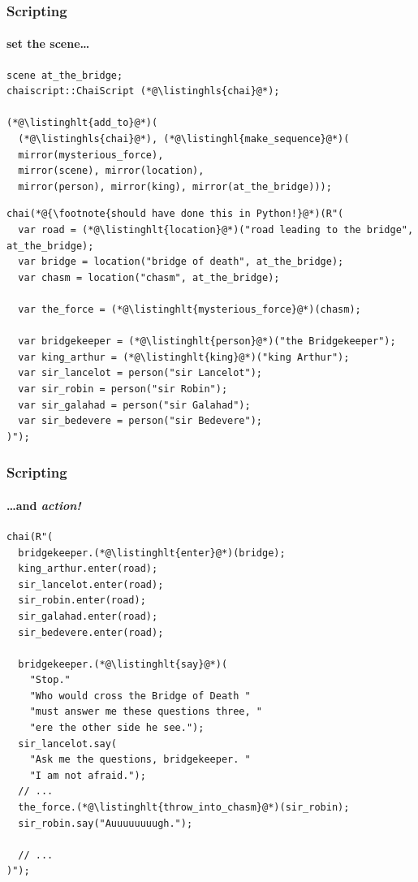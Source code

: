 \documentclass[compress,table,xcolor=table]{beamer}
\begin{document}
\begin{frame}[fragile]
  \frametitle{Scripting}
  \framesubtitle{set the scene\ldots}
  \begin{lstlisting}[language=c++2x,basicstyle=\scriptsize\ttfamily]
scene at_the_bridge;
chaiscript::ChaiScript (*@\listinghls{chai}@*);

(*@\listinghlt{add_to}@*)(
  (*@\listinghls{chai}@*), (*@\listinghl{make_sequence}@*)(
  mirror(mysterious_force),
  mirror(scene), mirror(location),
  mirror(person), mirror(king), mirror(at_the_bridge)));
  \end{lstlisting}
  \begin{lstlisting}[language=c++2x,basicstyle=\tiny\ttfamily]
chai(*@{\footnote{should have done this in Python!}@*)(R"(
  var road = (*@\listinghlt{location}@*)("road leading to the bridge", at_the_bridge);
  var bridge = location("bridge of death", at_the_bridge);
  var chasm = location("chasm", at_the_bridge);

  var the_force = (*@\listinghlt{mysterious_force}@*)(chasm);

  var bridgekeeper = (*@\listinghlt{person}@*)("the Bridgekeeper");
  var king_arthur = (*@\listinghlt{king}@*)("king Arthur");
  var sir_lancelot = person("sir Lancelot");
  var sir_robin = person("sir Robin");
  var sir_galahad = person("sir Galahad");
  var sir_bedevere = person("sir Bedevere");
)");
  \end{lstlisting}
\end{frame}
\begin{frame}[fragile]
  \frametitle{Scripting}
  \framesubtitle{\ldots and {\em \larger action!}}
  \begin{lstlisting}[language=c++2x,basicstyle=\scriptsize\ttfamily]
chai(R"(
  bridgekeeper.(*@\listinghlt{enter}@*)(bridge);
  king_arthur.enter(road);
  sir_lancelot.enter(road);
  sir_robin.enter(road);
  sir_galahad.enter(road);
  sir_bedevere.enter(road);

  bridgekeeper.(*@\listinghlt{say}@*)(
    "Stop."
    "Who would cross the Bridge of Death "
    "must answer me these questions three, "
    "ere the other side he see.");
  sir_lancelot.say(
    "Ask me the questions, bridgekeeper. "
    "I am not afraid.");
  // ...
  the_force.(*@\listinghlt{throw_into_chasm}@*)(sir_robin);
  sir_robin.say("Auuuuuuuugh.");

  // ...
)");
  \end{lstlisting}
\end{frame}
\end{document}
